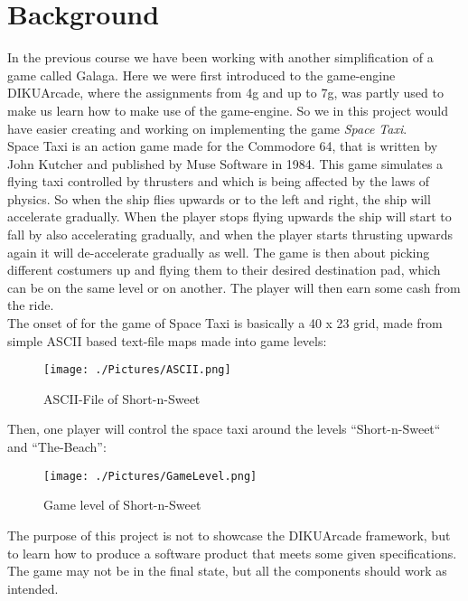 \section{Background}
In the previous course we have been working with another simplification of a game called Galaga. Here we were first introduced to the game-engine DIKUArcade, where the assignments from 4g and up to 7g, was partly used to make us learn how to make use of the game-engine. So we in this project would have easier creating and working on implementing the game \textit{Space Taxi}.\\

Space Taxi is an action game made for the Commodore 64, that is written by John Kutcher and published by Muse Software in 1984. This game simulates a flying taxi controlled by thrusters and which is being affected by the laws of physics. So when the ship flies upwards or to the left and right, the ship will accelerate gradually. When the player stops flying upwards the ship will start to fall by also accelerating gradually, and when the player starts thrusting upwards again it will de-accelerate gradually as well. The game is then about picking different costumers up and flying them to their desired destination pad, which can be on the same level or on another. The player will then earn some cash from the ride.\\

The onset of for the game of Space Taxi is basically a 40 x 23 grid, made from simple ASCII based text-file maps made into game levels:
\begin{figure}[h]
	\centering
	\texttt{[image: ./Pictures/ASCII.png]}
    \caption{ASCII-File of Short-n-Sweet}
\end{figure}

\newpage

Then, one player will control the space taxi around the levels ``Short-n-Sweet`` and ``The-Beach'':
\begin{figure}[h]
	\centering
	\texttt{[image: ./Pictures/GameLevel.png]}
    \caption{Game level of Short-n-Sweet}
\end{figure}

The purpose of this project is not to showcase the DIKUArcade framework, but to learn how to produce a software product that meets some given specifications. The game may not be in the final state, but all the components should work as intended.\\


